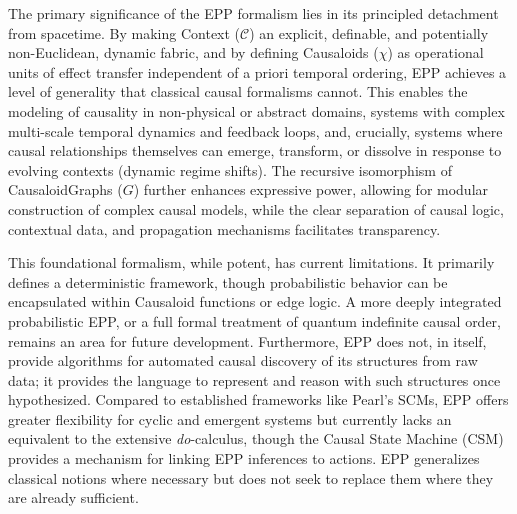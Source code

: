 The primary significance of the EPP formalism lies in its principled detachment from spacetime. By making Context (\(\mathcal{C}\)) an explicit, definable, and potentially non-Euclidean, dynamic fabric, and by defining Causaloids (\(\chi\)) as operational units of effect transfer independent of a priori temporal ordering, EPP achieves a level of generality that classical causal formalisms cannot. This enables the modeling of causality in non-physical or abstract domains, systems with complex multi-scale temporal dynamics and feedback loops, and, crucially, systems where causal relationships themselves can emerge, transform, or dissolve in response to evolving contexts (dynamic regime shifts). The recursive isomorphism of CausaloidGraphs (\(G\)) further enhances expressive power, allowing for modular construction of complex causal models, while the clear separation of causal logic, contextual data, and propagation mechanisms facilitates transparency.

This foundational formalism, while potent, has current limitations. It primarily defines a deterministic framework, though probabilistic behavior can be encapsulated within Causaloid functions or edge logic. A more deeply integrated probabilistic EPP, or a full formal treatment of quantum indefinite causal order, remains an area for future development. Furthermore, EPP does not, in itself, provide algorithms for automated causal discovery of its structures from raw data; it provides the language to represent and reason with such structures once hypothesized. Compared to established frameworks like Pearl's SCMs, EPP offers greater flexibility for cyclic and emergent systems but currently lacks an equivalent to the extensive \textit{do}-calculus, though the Causal State Machine (CSM) provides a mechanism for linking EPP inferences to actions. EPP generalizes classical notions where necessary but does not seek to replace them where they are already sufficient.

\newpage    